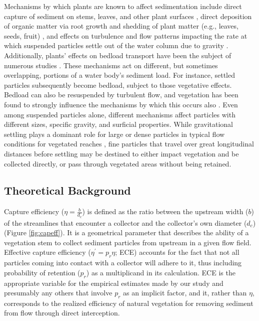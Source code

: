 \documentclass[geosciences,article,submit,moreauthors,pdftex]{Definitions/mdpi}
\begin{document}
Mechanisms by which plants are known to affect sedimentation include direct capture of sediment on stems, leaves, and other plant surfaces \cite{mudd2010does}, direct deposition of organic matter via root growth and shedding of plant matter (e.g., leaves, seeds, fruit) \cite{nyman2006marsh, neubauer2008contributions}, and effects on turbulence and flow patterns impacting the rate at which suspended particles settle out of the water column due to gravity \cite{christiansen2000flow, leonard1995flow}. Additionally, plants' effects on bedload transport have been the subject of numerous studies \cite[e.g.,][]{yager2013influence, yang2019impact, jordanova2003experimental}. These mechanisms act on different, but sometimes overlapping, portions of a water body's sediment load. For instance, settled particles subsequently become bedload, subject to those vegetative effects. Bedload can also be resuspended by turbulent flow, and vegetation has been found to strongly influence the mechanisms by which this occurs also \cite{tinoco2018turbulence}. Even among suspended particles alone, different mechanisms affect particles with different sizes, specific gravity, and surficial properties. While gravitational settling plays a dominant role for large or dense particles in typical flow conditions for vegetated reaches \cite{mudd2010does, leonard1995flow}, fine particles that travel over great longitudinal distances before settling may be destined to either impact vegetation and be collected directly, or pass through vegetated areas without being retained.

\subsection{Theoretical Background}

Capture efficiency ($\eta=\frac{b}{d_c}$) is defined as the ratio between the upstream width ($b$) of the streamlines that encounter a collector and the collector's own diameter ($d_c$) (Figure \ref{fig:capeff}). It is a geometrical parameter that describes the ability of a vegetation stem to collect sediment particles from upstream in a given flow field. Effective capture efficiency ($\eta^\prime=p_r\eta$; ECE) accounts for the fact that not all particles coming into contact with a collector will adhere to it, thus including probability of retention ($p_r$) as a multiplicand in its calculation. ECE is the appropriate variable for the empirical estimates made by our study and presumably any others that involve $p_r$ as an implicit factor, and it, rather than $\eta$, corresponds to the realized efficiency of natural vegetation for removing sediment from flow through direct interception.
\end{document}
